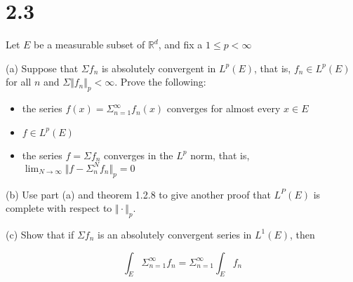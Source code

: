\documentclass[10pt]{article}
\newenvironment{problem}[2][Problem]{\begin{trivlist}
\item[\hskip \labelsep {\bfseries #1}\hskip \labelsep {\bfseries #2.}]}{\end{trivlist}}
\begin{document}
\section*{2.3}

\begin{problem}{7.3.22}

Let $E$ be a measurable subset of $\mathbb{R}^d$, and fix a $1 \leq p < \infty$

(a) Suppose that $\Sigma f_n$ is absolutely convergent in $L^p(E)$, that is, $f_n \in L^p(E)$ for all $n$ and $\Sigma \Vert f_n \Vert_p < \infty$. Prove the following:

\begin{itemize}
\item the series $f(x) = \Sigma_{n=1}^\infty f_n(x)$ converges for almost every $x \in E$ \\
\item $f \in L^p(E)$\\
\item the series $f = \Sigma f_n$ converges in the $L^p$ norm, that is, $\lim_{N \to \infty} \Vert f - \Sigma_n^N f_n \Vert_p = 0$
\end{itemize}

(b) Use part (a) and theorem 1.2.8 to give another proof that $L^P(E)$ is complete with respect to $\Vert \cdot \Vert_p$.

(c) Show that if $\Sigma f_n$ is an absolutely convergent series in $L^1(E)$, then

$$\int_E \Sigma_{n=1}^\infty f_n = \Sigma_{n=1}^\infty \int_E f_n $$


\end{problem}
\end{document}
